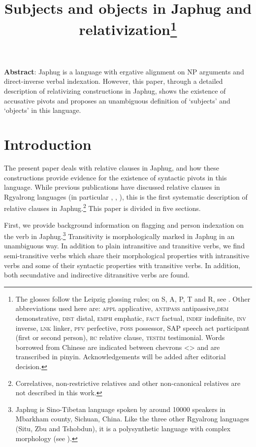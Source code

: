\documentclass[oldfontcommands,oneside,a4paper,11pt]{article}
\begin{document}
 
\title{Subjects and objects in Japhug and relativization\footnote{
The glosses follow the Leipzig glossing rules; on S, A, P, T and R, see \citet{haspelmath11SAPTR}. Other abbreviations used here are: \textsc{appl} applicative, \textsc{antipass} antipassive,\textsc{dem} demonstrative, \textsc{dist} distal, \textsc{emph} emphatic, \textsc{fact} factual, \textsc{indef} indefinite, \textsc{inv} inverse,  \textsc{lnk} linker, \textsc{pfv} perfective, \textsc{poss} possessor, SAP speech act participant (first or second person), \textsc{rc} relative clause, \textsc{testim} testimonial. Words borrowed from Chinese are indicated between chevrons <> and are transcribed in pinyin. %
Acknowledgements will be added after editorial decision. %
} }
\maketitle
\linenumbers

\textbf{Abstract}: Japhug is a language with ergative alignment on NP arguments and direct-inverse verbal indexation. However, this paper, through  a detailed description of relativizing constructions in Japhug, shows the existence of accusative pivots and proposes an unambiguous definition of `subjects' and `objects' in this language. 


\section{Introduction}
The present paper deals with relative clauses in Japhug, and how these constructions provide evidence for the existence of syntactic pivots in this language. While previous publications have discussed relative clauses in Rgyalrong languages (in particular \citealt{jackson06guanxiju}, \citealt{jacksonlin07}, \citealt{jacques08zh}), this is the first systematic description of relative clauses in Japhug.\footnote{Correlatives, non-restrictive relatives and other non-canonical relatives are not described in this work.} This paper is divided in five sections.

First, we provide background information on flagging and person indexation on the verb in Japhug.\footnote{Japhug is Sino-Tibetan language spoken by around 10000 speakers in Mbarkham county, Sichuan, China. Like the three other Rgyalrong languages (Situ, Zbu and Tshobdun), it is a polysynthetic language with complex morphology (see \citealt{jacques14antipassive}). }  Transitivity is morphologically marked in Japhug in an unambiguous way. In addition to plain intransitive  and transitive verbs, we find  semi-transitive verbs which share their morphological properties with intransitive verbs and some of their syntactic properties with transitive verbs. In addition,  both secundative and indirective ditransitive verbs are found.
\end{document}
